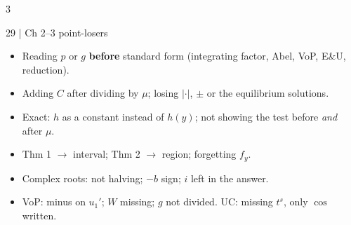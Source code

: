 \documentclass[8pt]{extarticle}
\begin{document}
\begin{multicols*}{3}
\begin{warn}{29 \;|\; Ch 2--3 point-losers}
\begin{itemize}
\item Reading $p$ or $g$ \textbf{before} standard form (integrating factor, Abel, VoP, E\&U, reduction).
\item Adding $C$ after dividing by $\mu$; losing $|\cdot|$, $\pm$ or the equilibrium solutions.
\item Exact: $h$ as a constant instead of $h(y)$; not showing the test before \emph{and} after $\mu$.
\item Thm 1 $\to$ interval; Thm 2 $\to$ region; forgetting $f_y$.
\item Complex roots: not halving; $-b$ sign; $i$ left in the answer.
\item VoP: minus on $u_1'$; $W$ missing; $g$ not divided. UC: missing $t^s$, only $\cos$ written.
\end{itemize}
\end{warn}

\end{multicols*}
\newpage
\fontsize{6.3}{6.95}\selectfont
\end{document}
